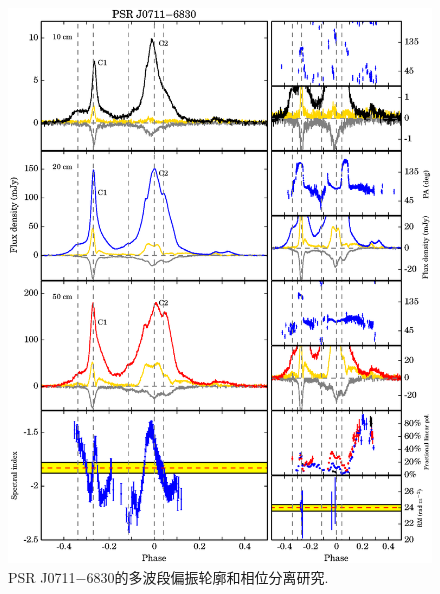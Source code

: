 \begin{figure}
\begin{center}
\includegraphics[width=6 in]{0711.ps}
\caption{PSR J0711$-$6830的多波段偏振轮廓和相位分离研究.}
\label{0711}
\end{center}
\end{figure}

